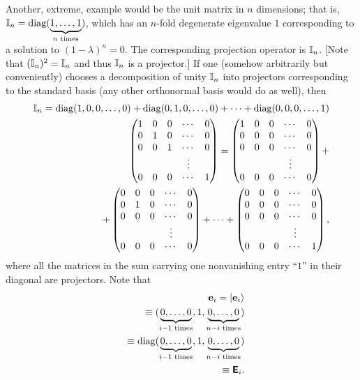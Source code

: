 {Another, extreme, example would be the unit matrix in $n$ dimensions; that is,
${\Bbb I}_n=\textrm{diag}(\underbrace{1,\ldots ,1}_{n \textrm{ times}})$,
which has an $n$-fold degenerate eigenvalue $1$ corresponding to a solution to
$(1-\lambda )^n=0$.
The corresponding projection operator is ${\Bbb I}_n$.  [Note that $({\Bbb I}_n)^2 ={\Bbb I}_n$
and thus ${\Bbb I}_n$ is a projector.]
If one (somehow arbitrarily but conveniently) chooses a decomposition of unity ${\Bbb I}_n$
into projectors corresponding to the standard basis (any other orthonormal basis would do as well),
then
\begin{equation}
\begin{split}
{\Bbb I}_n = \textrm{diag}( 1,0,0,\ldots ,0 )
+   \textrm{diag}( 0,1,0,\ldots ,0 )
+ \cdots
+   \textrm{diag}( 0,0,0,\ldots ,1 )\\
\begin{pmatrix}
 1&0&0&\cdots &0\\
 0&1&0&\cdots &0\\
 0&0&1&\cdots &0\\
&&&\vdots&\\
 0&0&0&\cdots &1
\end{pmatrix}  =
\begin{pmatrix}
 1&0&0&\cdots &0\\
 0&0&0&\cdots &0\\
 0&0&0&\cdots &0\\
&&&\vdots&\\
 0&0&0&\cdots &0
\end{pmatrix}  +
\\
\quad
+%
\begin{pmatrix}
 0&0&0&\cdots &0\\
 0&1&0&\cdots &0\\
 0&0&0&\cdots &0\\
&&&\vdots&\\
 0&0&0&\cdots &0
\end{pmatrix} +\cdots
+%
\begin{pmatrix}
 0&0&0&\cdots &0\\
 0&0&0&\cdots &0\\
 0&0&0&\cdots &0\\
&&&\vdots&\\
 0&0&0&\cdots &1
\end{pmatrix}
,
\end{split}
\end{equation}
where all the matrices in the sum carrying one nonvanishing entry ``$1$''
in their diagonal are  projectors.
Note that
\begin{equation}
\begin{split}
{\bf e}_i=\vert {\bf e}_i \rangle  \\
\quad \equiv ( \underbrace{0,\ldots , 0}_{i-1 \textrm{ times}}, 1, \underbrace{0,\ldots , 0}_{n-i \textrm{ times}} )   \\
\quad \equiv  \textrm{diag}(  \underbrace{0,\ldots , 0}_{i-1 \textrm{ times}}, 1, \underbrace{0,\ldots , 0}_{n-i \textrm{ times}}  )
  \\
\quad \equiv  \textsf{\textbf{E}}_{i}.
\end{split}
\end{equation}
{\textrm{\eexample}}
}


